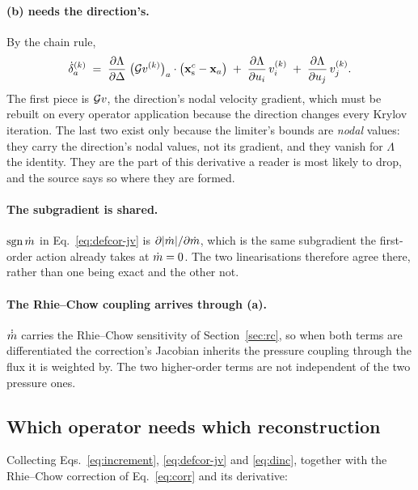 \paragraph{(b) needs the direction's.} By the chain rule,
\begin{equation}
\dot{\delta}^{(k)}_a
\;=\;
\frac{\partial\Lambda}{\partial\Delta}\;
      \bigl(\mathcal{G} v^{(k)}\bigr)_a \cdot \bigl(\mathbf{x}^c_{\mathrm{s}} - \mathbf{x}_a\bigr)
\;+\;
\frac{\partial\Lambda}{\partial u_i}\,v^{(k)}_i
\;+\;
\frac{\partial\Lambda}{\partial u_j}\,v^{(k)}_j .
\label{eq:dinc}
\end{equation}
The first piece is $\mathcal{G} v$, the direction's nodal velocity gradient, which must be rebuilt on
every operator application because the direction changes every Krylov iteration. The last two
exist only because the limiter's bounds are \emph{nodal} values: they carry the direction's nodal
values, not its gradient, and they vanish for $\Lambda$ the identity. They are the part of this
derivative a reader is most likely to drop, and the source says so where they are formed.

\paragraph{The subgradient is shared.} $\operatorname{sgn}\dot{m}$ in Eq.~\eqref{eq:defcor-jv} is
$\partial|\dot{m}|/\partial\dot{m}$, which is the same subgradient the first-order action already
takes at $\dot{m} = 0$. The two linearisations therefore agree there, rather than one being exact
and the other not.

\paragraph{The Rhie--Chow coupling arrives through (a).} $\dot{\dot{m}}$ carries the Rhie--Chow
sensitivity of Section~\ref{sec:rc}, so when both terms are differentiated the correction's
Jacobian inherits the pressure coupling through the flux it is weighted by. The two higher-order
terms are not independent of the two pressure ones.

\subsection{Which operator needs which reconstruction}
\label{sec:schemes:needs}

Collecting Eqs.~\eqref{eq:increment}, \eqref{eq:defcor-jv} and \eqref{eq:dinc}, together with the
Rhie--Chow correction of Eq.~\eqref{eq:corr} and its derivative:

